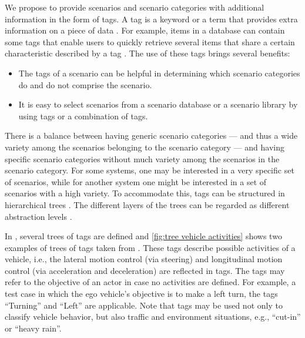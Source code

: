 We propose to provide scenarios and scenario categories with additional information in the form of tags.
A tag is a keyword or a term that provides extra information on a piece of data \autocite{smith2007tagging}. For example, items in a database can contain some tags that enable users to quickly retrieve several items that share a certain characteristic described by a tag \autocite{craft2004tagging}. 
The use of these tags brings several benefits:
\begin{itemize}
	\item The tags of a scenario can be helpful in determining which scenario categories do and do not comprise the scenario.
	\item It is easy to select scenarios from a scenario database or a scenario library by using tags or a combination of tags.
\end{itemize}

There is a balance between having generic scenario categories --- and thus a wide variety among the scenarios belonging to the scenario category --- and having specific scenario categories without much variety among the scenarios in the scenario category. For some systems, one may be interested in a very specific set of scenarios, while for another system one might be interested in a set of scenarios with a high variety. To accommodate this, tags can be structured in hierarchical trees \autocite{molloy2017dynamic}. The different layers of the trees can be regarded as different abstraction levels \autocite{Bonnin2014}. 

In \autocite{degelder2019scenariocategories}, several trees of tags are defined and \cref{fig:tree vehicle activities} shows two examples of trees of tags taken from \autocite{degelder2019scenariocategories}. These tags describe possible activities of a vehicle, i.e., the lateral motion control (via steering) and longitudinal motion control (via acceleration and deceleration) are reflected in tags. The tags may refer to the objective of an actor in case no activities are defined. For example, a test case in which the ego vehicle's objective is to make a left turn, the tags ``Turning'' and ``Left'' are applicable. Note that tags may be used not only to classify vehicle behavior, but also traffic and environment situations, e.g., ``cut-in'' or ``heavy rain''.

